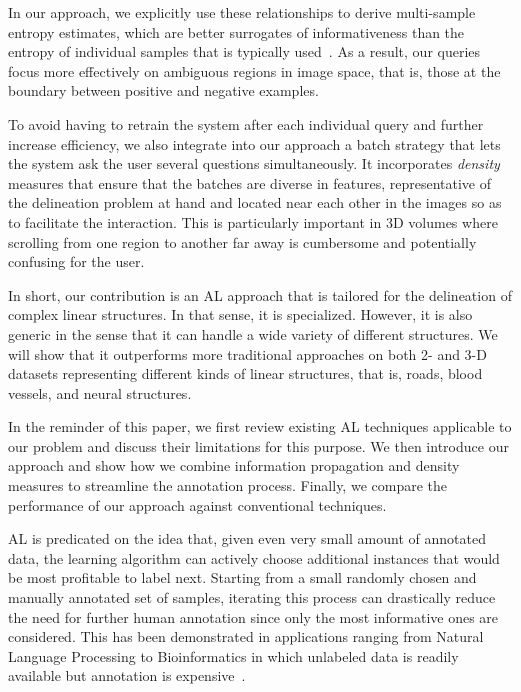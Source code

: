 \documentclass[10pt,twocolumn,letterpaper]{article}
\begin{document}
In our  approach, we explicitly  use these relationships to  derive multi-sample
entropy  estimates, which  are  better surrogates  of  informativeness than  the
entropy of  individual samples that  is typically used~\cite{Lewis94}. As  a result,
our queries focus more effectively on ambiguous regions in image space, that is,
those at the boundary between positive and negative examples.

To avoid  having to retrain the  system after each individual  query and further
increase efficiency, we  also integrate into our approach a  batch strategy that
lets the  system ask  the user  several  questions  simultaneously.   It
incorporates {\it  density} measures  that ensure that  the batches  are diverse in features,
representative of the delineation problem at hand and located near each other in
the images so as to facilitate  the interaction.  This is particularly important
in 3D volumes where scrolling from one  region to another far away is cumbersome
and potentially confusing for the user.

In short,  our contribution is an  AL approach that  is tailored for
the  delineation   of  complex  linear   structures.   In  that  sense,   it  is
specialized. However, it is also generic in  the sense that it can handle a wide
variety  of  different structures. We will show
that it  outperforms more  traditional approaches  on both  2- and  3-D datasets
representing different kinds of linear structures, that is, roads, blood vessels, and neural structures.

In the reminder of this paper, we first review existing AL techniques applicable
to  our  problem and  discuss  their  limitations  for  this purpose.   We  then
introduce  our approach  and show  how  we combine  information propagation  and
density measures  to streamline the  annotation process.  Finally,  we compare
the performance  of our  approach against conventional  techniques.


AL is predicated on the idea that, given even very small amount of
annotated data, the learning algorithm  can actively choose additional instances
that would be most profitable to  label next.  Starting from a small randomly
chosen and  manually annotated  set of  samples, iterating this  process can
drastically reduce  the need for  further human  annotation since only  the most
informative ones  are considered.   This has  been demonstrated  in applications
ranging from  Natural Language Processing  to Bioinformatics in  which unlabeled
data       is       readily        available       but       annotation       is
expensive~\cite{Settles11}.
\end{document}
